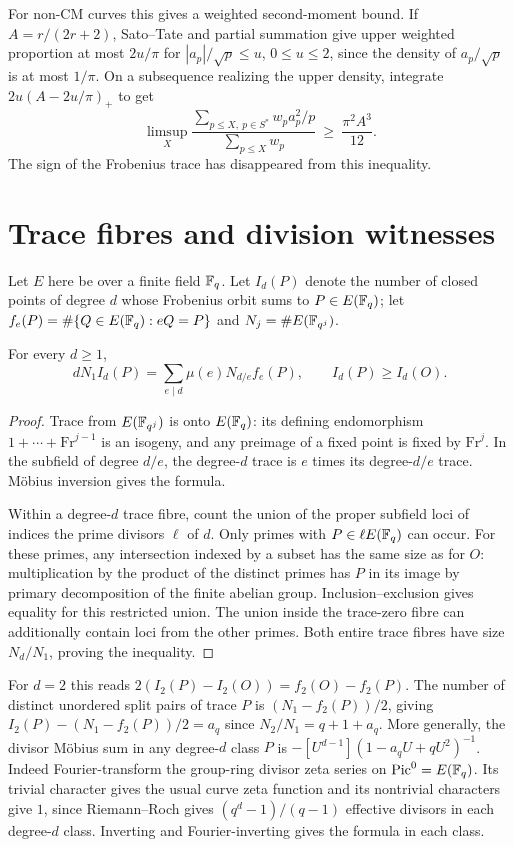 \documentclass[11pt]{article}
\begin{document}
For non-CM curves this gives a weighted second-moment bound. If $A=r/(2r+2)$, Sato--Tate \cite{ST} and partial summation give upper weighted proportion at most $2u/\pi$ for $|a_p|/\sqrt p\le u$, $0\le u\le2$, since the density of $a_p/\sqrt p$ is at most $1/\pi$. On a subsequence realizing the upper density, integrate $2u(A-2u/\pi)_+$ to get
\[
 \limsup_X\frac{\sum_{p\le X,\ p\in S^\ast}w_p a_p^2/p}{\sum_{p\le X} w_p}
 \ \ge\ \frac{\pi^2 A^3}{12}.
\]
The sign of the Frobenius trace has disappeared from this inequality.

\section{Trace fibres and division witnesses}
Let $E$ here be over a finite field $\mathbb F_q$. Let $I_d(P)$ denote the number of closed points of degree $d$ whose Frobenius orbit sums to $P\in E(\mathbb F_q)$; let $f_e(P)=\#\{Q\in E(\mathbb F_q):eQ=P\}$ and $N_j=\#E(\mathbb F_{q^j})$.
\begin{prop}
For every $d\ge1$,
\[
 dN_1 I_d(P)=\sum_{e\mid d}\mu(e)N_{d/e} f_e(P),
 \qquad I_d(P)\ge I_d(O).
\]
\end{prop}
\begin{proof}
Trace from $E(\mathbb F_{q^j})$ is onto $E(\mathbb F_q)$: its defining endomorphism $1+\cdots+\mathrm{Fr}^{j-1}$ is an isogeny, and any preimage of a fixed point is fixed by $\mathrm{Fr}^j$. In the subfield of degree $d/e$, the degree-$d$ trace is $e$ times its degree-$d/e$ trace. M\"obius inversion gives the formula.

Within a degree-$d$ trace fibre, count the union of the proper subfield loci of indices the prime divisors $\ell$ of $d$. Only primes with $P\in\ell E(\mathbb F_q)$ can occur. For these primes, any intersection indexed by a subset has the same size as for $O$: multiplication by the product of the distinct primes has $P$ in its image by primary decomposition of the finite abelian group. Inclusion--exclusion gives equality for this restricted union. The union inside the trace-zero fibre can additionally contain loci from the other primes. Both entire trace fibres have size $N_d/N_1$, proving the inequality.
\end{proof}
For $d=2$ this reads $2(I_2(P)-I_2(O))=f_2(O)-f_2(P)$. The number of distinct unordered split pairs of trace $P$ is $(N_1-f_2(P))/2$, giving $I_2(P)-(N_1-f_2(P))/2=a_q$ since $N_2/N_1=q+1+a_q$. More generally, the divisor M\"obius sum in any degree-$d$ class $P$ is
$-[U^{d-1}](1-a_qU+qU^2)^{-1}$. Indeed Fourier-transform the group-ring divisor zeta series on $\operatorname{Pic}^0=E(\mathbb F_q)$. Its trivial character gives the usual curve zeta function and its nontrivial characters give $1$, since Riemann--Roch gives $(q^d-1)/(q-1)$ effective divisors in each degree-$d$ class. Inverting and Fourier-inverting gives the formula in each class.
\end{document}
